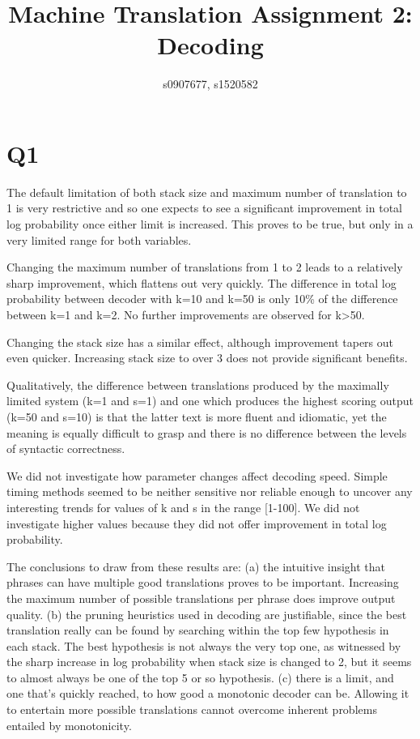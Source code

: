 \documentclass[11pt]{article}
\title{Machine Translation Assignment 2: Decoding} %
\author{s0907677, s1520582} %
\date{}
\begin{document}
\maketitle %

\section*{Q1}
The default limitation of both stack size and maximum number of translation to 1 is very restrictive and so one expects to see a significant improvement in total log probability once either limit is increased. This proves to be true, but only in a very limited range for both variables.

Changing the maximum number of translations from 1 to 2 leads to a relatively sharp improvement, which flattens out very quickly. The difference in total log probability between decoder with k=10 and k=50 is only 10\% of the difference between k=1 and k=2. No further improvements are observed for k>50.

Changing the stack size has a similar effect, although improvement tapers out even quicker. Increasing stack size to over 3 does not provide significant benefits.

Qualitatively, the difference between translations produced by the maximally limited system (k=1 and s=1) and one which produces the highest scoring output (k=50 and s=10) is that the latter text is more fluent and idiomatic,  yet the meaning is equally difficult to grasp and there is no difference between the levels of syntactic correctness.

We did not investigate how parameter changes affect decoding speed. Simple timing methods seemed to be neither sensitive nor reliable enough to uncover any interesting trends for values of k and s in the range [1-100]. We did not investigate higher values because they did not offer improvement in total log probability.

The conclusions to draw from these results are:
(a) the intuitive insight that phrases can have multiple good translations proves to be important. Increasing the maximum number of possible translations per phrase does improve output quality.
(b) the pruning heuristics used in decoding are justifiable, since the best translation really can be found by searching within the top few hypothesis in each stack. The best hypothesis is not always the very top one, as witnessed by the sharp increase in log probability when stack size is changed to 2, but it seems to almost always be one of the top 5 or so hypothesis.
(c) there is a limit, and one that's quickly reached, to how good a monotonic decoder can be. Allowing it to entertain more possible translations cannot overcome inherent problems entailed by monotonicity.
\end{document}
